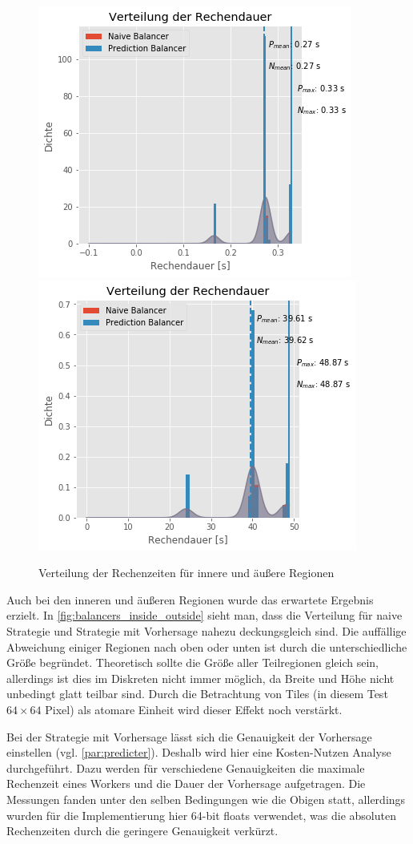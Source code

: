 \begin{figure}
	\centering
	\includegraphics[width=0.45\linewidth]{img/Evaluation/balancers/balancers_outside_slim.png}
	\includegraphics[width=0.45\linewidth]{img/Evaluation/balancers/balancers_inside_slim.png}
	\caption{Verteilung der Rechenzeiten für innere und äußere Regionen}
	\label{fig:balancers_inside_outside}
\end{figure}

Auch bei den inneren und äußeren Regionen wurde das erwartete Ergebnis erzielt.
In \autoref{fig:balancers_inside_outside} sieht man, dass die Verteilung für naive Strategie und Strategie mit Vorhersage nahezu deckungsgleich sind.
Die auffällige Abweichung einiger Regionen nach oben oder unten ist durch die unterschiedliche Größe begründet.
Theoretisch sollte die Größe aller Teilregionen gleich sein, allerdings ist dies im Diskreten nicht immer möglich, da Breite und Höhe nicht unbedingt glatt teilbar sind.
Durch die Betrachtung von Tiles (in diesem Test $64\times64$ Pixel) als atomare Einheit wird dieser Effekt noch verstärkt.

Bei der Strategie mit Vorhersage lässt sich die Genauigkeit der Vorhersage einstellen (vgl. \autoref{par:predicter}).
Deshalb wird hier eine Kosten-Nutzen Analyse durchgeführt.
Dazu werden für verschiedene Genauigkeiten die maximale Rechenzeit eines Workers und die Dauer der Vorhersage aufgetragen.
Die Messungen fanden unter den selben Bedingungen wie die Obigen statt, allerdings wurden für die Implementierung hier 64-bit floats verwendet, was die absoluten Rechenzeiten durch die geringere Genauigkeit verkürzt.

